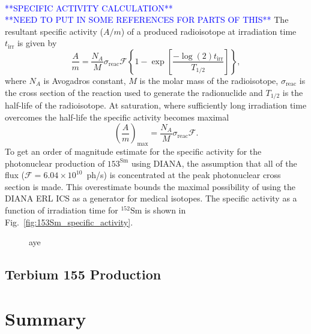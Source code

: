 \documentclass[../main.tex]{subfiles}
\begin{document}
\textcolor{blue}{\\**SPECIFIC ACTIVITY CALCULATION**\\**NEED TO PUT IN SOME REFERENCES FOR PARTS OF THIS**}
The resultant specific activity ($A/m$) of a produced radioisotope at irradiation time $t_{\mathrm{irr}}$ is given by \cite{habs2011production}
\begin{equation}
\frac{A}{m} = \frac{N_{A}}{M}\sigma_{\mathrm{reac}}\mathcal{F}\left\{1-\exp\left[\frac{-\log\left(2\right)t_{\mathrm{irr}}}{T_{1/2}}\right]\right\},
\label{eq:specific_activity}    
\end{equation}
where $N_{A}$ is Avogadros constant, $M$ is the molar mass of the radioisotope, $\sigma_{\mathrm{reac}}$ is the cross section of the reaction used to generate the radionuclide and $T_{1/2}$ is the half-life of the radioisotope. At saturation, where sufficiently long irradiation time overcomes the half-life the specific activity becomes maximal
\begin{equation}
\left(\frac{A}{m}\right)_{\mathrm{max}} = \frac{N_{A}}{M}\sigma_{\mathrm{reac}}\mathcal{F}.
\label{eq:max_specific_activity}    
\end{equation}
To get an order of magnitude estimate for the specific activity for the photonuclear production of $153^{\mathrm{Sm}}$ using DIANA, the assumption that all of the flux ($\mathcal{F} = 6.04\times 10^{10}$~ph/\si{\second}) is concentrated at the peak photonuclear cross section is made. This overestimate bounds the maximal possibility of using the DIANA ERL ICS as a generator for medical isotopes. The specific activity as a function of irradiation time for $^{152}\mathrm{Sm}$ is shown in Fig.~\ref{fig:153Sm_specific_activity}.
\begin{figure}[!h]
\centering
\caption{aye}
\end{figure}


\subsection{Terbium 155 Production}



\section{Summary}
\end{document}
